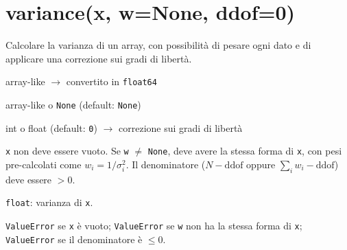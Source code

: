 \section{\texorpdfstring{variance(x, w=None, ddof=0)}{variance(x, w=None, ddof=0)}}
\label{sec:variance}
\begin{apidesc}
  \item[\textbf{Scopo}]
    Calcolare la varianza di un array, con possibilità di pesare ogni dato
    e di applicare una correzione sui gradi di libertà.
  \item[\textbf{Parametri}]\hfill
    \begin{description}[font=\normalfont\ttfamily\bfseries, labelwidth=2.5em, leftmargin=3em, itemsep=1pt, parsep=0pt, topsep=1pt]
      \item[x] array-like $\to$ convertito in \texttt{float64}
      \item[w] array-like o \texttt{None} (default: \texttt{None})
      \item[ddof] int o float (default: \texttt{0}) $\to$ correzione sui gradi di libertà
    \end{description}
  \item[\textbf{Vincoli}]
    \texttt{x} non deve essere vuoto.
    Se \texttt{w} $\neq$ \texttt{None}, deve avere la stessa forma di \texttt{x},
    con pesi pre-calcolati come $w_i = 1/\sigma_i^2$.
    Il denominatore ($N - \text{ddof}$ oppure $\sum_i w_i - \text{ddof}$) deve essere $> 0$.
  \item[\textbf{Restituisce}]
    \texttt{float}: varianza di \texttt{x}.
  \item[\textbf{Eccezioni}]
    \texttt{ValueError} se \texttt{x} è vuoto;
    \texttt{ValueError} se \texttt{w} non ha la stessa forma di \texttt{x};
    \texttt{ValueError} se il denominatore è $\leq 0$.
\end{apidesc}


